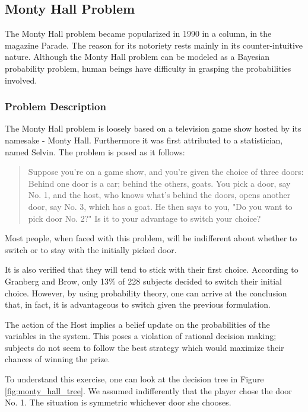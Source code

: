 \subsection{Monty Hall Problem}
\label{subsec:monty_hall}

The Monty Hall problem became popularized in 1990 in a column, in the magazine Parade\cite{Savant1990}. The reason for its notoriety rests mainly in its counter-intuitive nature. Although the Monty Hall problem can be modeled as a Bayesian probability problem, human beings have difficulty in grasping the probabilities involved.

\subsubsection{Problem Description}
\label{subsubsec:monty_hall_problem description}

The Monty Hall problem is loosely based on a television game show hosted by its namesake - Monty Hall. Furthermore it was first attributed to a statistician, named Selvin. The problem is posed as it follows:
\begin{quotation}
Suppose you're on a game show, and you're given the choice of three doors: Behind one door is a car; behind the others, goats. You pick a door, say No. 1, and the host, who knows what's behind the doors, opens another door, say No. 3, which has a goat. He then says to you, "Do you want to pick door No. 2?" Is it to your advantage to switch your choice?
\end{quotation}

Most people, when faced with this problem, will be indifferent about whether to switch or to stay with the initially picked door.
 
It is also verified that they will tend to stick with their first choice. According to Granberg and Brow\cite{Granberg1995}, only 13\% of 228 subjects decided to switch their initial choice. However, by using probability theory, one can arrive at the conclusion that, in fact, it is advantageous to switch given the previous formulation.
 
The action of the Host implies a belief update on the probabilities of the variables in the system. This poses a violation of rational decision making; subjects do not seem to follow the best strategy which would maximize their chances of winning the prize. 

To understand this exercise, one can look at the decision tree in Figure \ref{fig:monty_hall_tree}. We assumed indifferently that the player chose the door No. 1. The situation is symmetric whichever door she chooses. 


